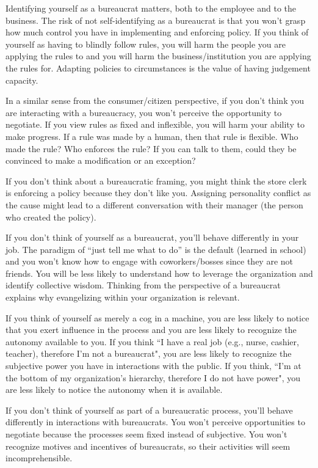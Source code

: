 Identifying yourself as a bureaucrat matters, both to the employee and to the business. The risk of not self-identifying as a bureaucrat is that you won't grasp how much control you have in implementing and enforcing policy. If you think of yourself as having to blindly follow rules, you will harm the people you are applying the rules to and you will harm the business/institution you are applying the rules for. Adapting policies to circumstances is the value of having judgement capacity. 

In a similar sense from the consumer/citizen perspective, if you don't think you are interacting with a bureaucracy, you won't perceive the opportunity to negotiate.  If you view rules as fixed and inflexible, you will harm your ability to make progress. If a rule was made by a human, then that rule is flexible. Who made the rule? Who enforces the rule? If you can talk to them, could they be convinced to make a modification or an exception?

If you don't think about a bureaucratic framing, you might think the store clerk is enforcing a policy because they don't like you. Assigning personality conflict as the cause might lead to a different conversation with their manager (the person who created the policy). 

If you don't think of yourself as a bureaucrat, you'll behave differently in your job. The paradigm of ``just tell me what to do'' is the default (learned in school) and you won't know how to engage with coworkers/bosses since they are not friends. You will be less likely to understand how to leverage the organization and identify collective wisdom. Thinking from the perspective of a bureaucrat explains why evangelizing within your organization is relevant. 

If you think of yourself as merely a cog in a machine, you are less likely to notice that you exert influence in the process and you are less likely to recognize the autonomy available to you. 
If you think ``I have a real job (e.g., nurse, cashier, teacher), therefore I'm not a bureaucrat", you are less likely to recognize the subjective power you have in interactions with the public.
If you think, ``I'm at the bottom of my organization's hierarchy, therefore I do not have power", you are less likely to notice the autonomy when it is available.

If you don't think of yourself as part of a bureaucratic process, you'll behave differently in interactions with bureaucrats.  You won't perceive opportunities to negotiate because the processes seem fixed instead of subjective. 
You won't recognize motives and incentives of bureaucrats, so their activities will seem incomprehensible.


